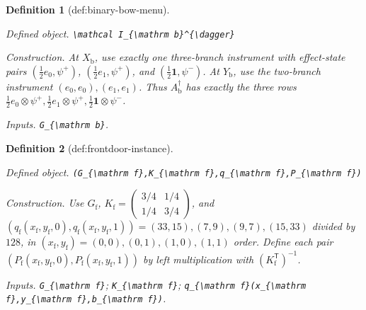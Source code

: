 \documentclass{article}
\newtheorem{definition}{Definition}
\begin{document}
\begin{definition}[def:binary-bow-menu]\label{def:binary-bow-menu}
\par\smallskip\noindent\emph{Defined object.} \texttt{\textbackslash{}\allowbreak{}mathcal I\_\allowbreak{}\{\textbackslash{}\allowbreak{}mathrm b\}\allowbreak{}\textasciicircum{}\{\textbackslash{}\allowbreak{}dagger\}\allowbreak{}}
\par\smallskip\noindent\emph{Construction.} At \(X_{\mathrm b}\), use exactly one three-branch instrument with effect-state pairs \((\tfrac12 e_0,\psi^{+})\), \((\tfrac12 e_1,\psi^{+})\), and \((\tfrac12\mathbf 1,\psi^{-})\). At \(Y_{\mathrm b}\), use the two-branch instrument \((e_0,e_0),(e_1,e_1)\). Thus \(A_{\mathrm b}^{\dagger}\) has exactly the three rows \(\tfrac12e_0\otimes\psi^{+},\tfrac12e_1\otimes\psi^{+},\tfrac12\mathbf 1\otimes\psi^{-}\).
\par\smallskip\noindent\emph{Inputs.} \texttt{G\_\allowbreak{}\{\textbackslash{}\allowbreak{}mathrm b\}\allowbreak{}}.
\end{definition}

\begin{definition}[def:frontdoor-instance]\label{def:frontdoor-instance}
\par\smallskip\noindent\emph{Defined object.} \texttt{(G\_\allowbreak{}\{\textbackslash{}\allowbreak{}mathrm f\}\allowbreak{},\allowbreak{}K\_\allowbreak{}\{\textbackslash{}\allowbreak{}mathrm f\}\allowbreak{},\allowbreak{}q\_\allowbreak{}\{\textbackslash{}\allowbreak{}mathrm f\}\allowbreak{},\allowbreak{}P\_\allowbreak{}\{\textbackslash{}\allowbreak{}mathrm f\}\allowbreak{})}
\par\smallskip\noindent\emph{Construction.} Use \(G_{\mathrm f}\), \(K_{\mathrm f}=\begin{pmatrix}3/4&1/4\\1/4&3/4\end{pmatrix}\), and \((q_{\mathrm f}(x_{\mathrm f},y_{\mathrm f},0),q_{\mathrm f}(x_{\mathrm f},y_{\mathrm f},1))=(33,15),(7,9),(9,7),(15,33)\) divided by \(128\), in \((x_{\mathrm f},y_{\mathrm f})=(0,0),(0,1),(1,0),(1,1)\) order. Define each pair \((P_{\mathrm f}(x_{\mathrm f},y_{\mathrm f},0),P_{\mathrm f}(x_{\mathrm f},y_{\mathrm f},1))\) by left multiplication with \((K_{\mathrm f}^{\mathsf T})^{-1}\).
\par\smallskip\noindent\emph{Inputs.} \texttt{G\_\allowbreak{}\{\textbackslash{}\allowbreak{}mathrm f\}\allowbreak{}}; \texttt{K\_\allowbreak{}\{\textbackslash{}\allowbreak{}mathrm f\}\allowbreak{}}; \texttt{q\_\allowbreak{}\{\textbackslash{}\allowbreak{}mathrm f\}\allowbreak{}(x\_\allowbreak{}\{\textbackslash{}\allowbreak{}mathrm f\}\allowbreak{},\allowbreak{}y\_\allowbreak{}\{\textbackslash{}\allowbreak{}mathrm f\}\allowbreak{},\allowbreak{}b\_\allowbreak{}\{\textbackslash{}\allowbreak{}mathrm f\}\allowbreak{})}.
\end{definition}
\end{document}
